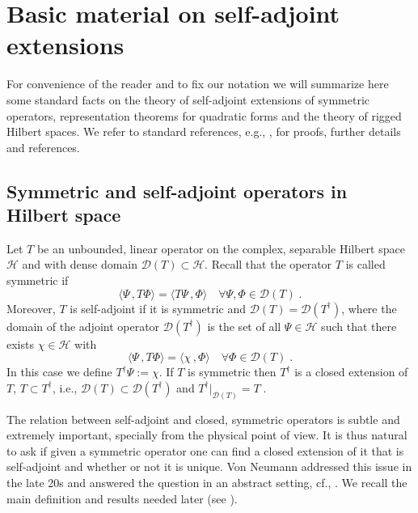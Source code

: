 \documentclass[a4paper,12pt]{amsart}
\newcommand{\scalar}[2]{\langle#1\,,#2\rangle}
\renewcommand{\H}{\mathcal{H}}
\newcommand{\D}{\mathcal{D}}
\newcommand{\1}{\mathbb{I}}
\numberwithin{equation}{section}
\numberwithin{theorem}{section}
\begin{document}
\section{Basic material on self-adjoint extensions}
\label{sec:Preliminaries}

For convenience of the reader and to fix our notation we will summarize here some standard facts on the theory of self-adjoint extensions
of symmetric operators, representation theorems for quadratic forms and the theory of rigged Hilbert spaces. We refer to standard references, e.g.,
\cite{reed80,akhiezer61b,schmuedgen12,kato95,koshmanenko99}, for proofs, further details and references.


\subsection{Symmetric and self-adjoint operators in Hilbert space}
\label{sec:vonNeumann}


Let $T$ be an unbounded, linear operator on the complex, separable Hilbert space $\H$ and with dense domain
$\D(T)\subset\H$. Recall that the operator $T$ is called symmetric if
$$\scalar{\Psi}{T\Phi}=\scalar{T\Psi}{\Phi}\quad\forall\Psi,\Phi\in\D(T)\;.$$
Moreover, $T$ is self-adjoint if it is symmetric and $\D(T)=\D(T^\dagger)$, where the
domain of the adjoint operator $\D(T^\dagger)$ is the set of all $\Psi\in\H$
such that there exists $\chi\in\H$ with
$$\scalar{\Psi}{T\Phi}=\scalar{\chi}{\Phi}\quad\forall\Phi\in\D(T)\;.$$
In this case we define $T^\dagger\Psi:=\chi$. If $T$ is symmetric then
$T^\dagger$ is a closed extension of $T$, $T\subset T^\dagger$, i.e., $\D(T)\subset\D(T^\dagger)$ and
$T^\dagger|_{\D(T)}=T\;.$



The relation between self-adjoint and closed, symmetric operators is subtle and extremely important, specially from the  physical point of view. It is thus natural to ask
if given a symmetric operator one can find a closed extension of it that is self-adjoint and
whether or not it is unique. Von Neumann addressed this issue in the late 20s and answered the question in an abstract setting,
cf., \cite{neumann30}. We recall the main definition and results needed later (see \cite[Theorem X.2]{reed75}).
\end{document}
